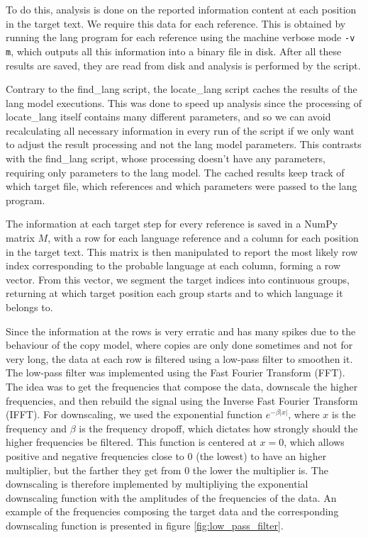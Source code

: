 \documentclass{article}
\begin{document}
To do this, analysis is done on the reported information content at each position in the target text.
We require this data for each reference.
This is obtained by running the lang program for each reference using the machine verbose mode \verb|-v m|, which outputs all this information into a binary file in disk.
After all these results are saved, they are read from disk and analysis is performed by the script.

Contrary to the find_lang script, the locate_lang script caches the results of the lang model executions.
This was done to speed up analysis since the processing of locate_lang itself contains many different parameters, and so we can avoid recalculating all necessary information in every run of the script if we only want to adjust the result processing and not the lang model parameters.
This contrasts with the find_lang script, whose processing doesn't have any parameters, requiring only parameters to the lang model.
The cached results keep track of which target file, which references and which parameters were passed to the lang program.

The information at each target step for every reference is saved in a NumPy matrix $M$, with a row for each language reference and a column for each position in the target text.
This matrix is then manipulated to report the most likely row index corresponding to the probable language at each column, forming a row vector.
From this vector, we segment the target indices into continuous groups, returning at which target position each group starts and to which language it belongs to.

Since the information at the rows is very erratic and has many spikes due to the behaviour of the copy model, where copies are only done sometimes and not for very long, the data at each row is filtered using a low-pass filter to smoothen it.
The low-pass filter was implemented using the Fast Fourier Transform (FFT).
The idea was to get the frequencies that compose the data, downscale the higher frequencies, and then rebuild the signal using the Inverse Fast Fourier Transform (IFFT).
For downscaling, we used the exponential function $e^{-\beta|x|}$, where $x$ is the frequency and $\beta$ is the frequency dropoff, which dictates how strongly should the higher frequencies be filtered.
This function is centered at $x=0$, which allows positive and negative frequencies close to 0 (the lowest) to have an higher multiplier, but the farther they get from 0 the lower the multiplier is.
The downscaling is therefore implemented by multipliying the exponential downscaling function with the amplitudes of the frequencies of the data.
An example of the frequencies composing the target data and the corresponding downscaling function is presented in figure \ref{fig:low_pass_filter}.
\end{document}
